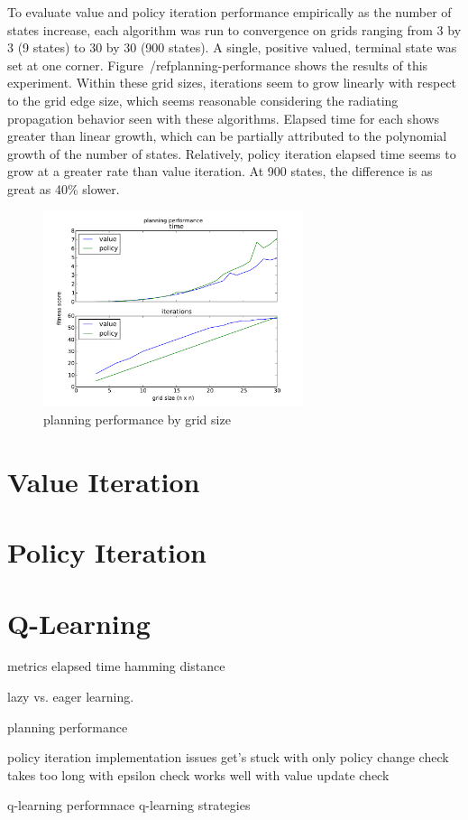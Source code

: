 \documentclass{sig-alternate}
\begin{document}
To evaluate value and policy iteration performance empirically as the number of states increase, each algorithm was run to convergence on grids ranging from 3 by 3 (9 states) to 30 by 30 (900 states). A single, positive valued, terminal state was set at one corner. Figure~/ref{planning-performance} shows the results of this experiment. Within these grid sizes, iterations seem to grow linearly with respect to the grid edge size, which seems reasonable considering the radiating propagation behavior seen with these algorithms. Elapsed time for each shows greater than linear growth, which can be partially attributed to the polynomial growth of the number of states. Relatively, policy iteration elapsed time seems to grow at a greater rate than value iteration. At 900 states, the difference is as great as 40\% slower.


\begin{figure}[!htbp]
    \centering
    \includegraphics[width=3in]{images/planning-performance.pdf}
    \caption{planning performance by grid size \label{planning-performance}}
\end{figure} 



\section{Value Iteration}


\section{Policy Iteration}

\section{Q-Learning}

metrics
    elapsed time
    hamming distance

lazy vs. eager learning.

planning performance

policy iteration implementation issues
    get's stuck with only policy change check
    takes too long with epsilon check
    works well with value update check


q-learning performnace
q-learning strategies










\end{document}
